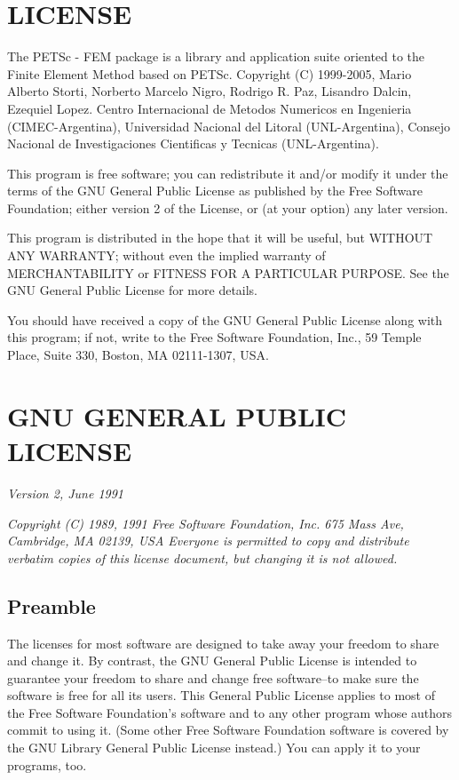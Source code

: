 \section{LICENSE}

The PETSc - FEM package is a library and application suite oriented to
the Finite Element Method based on PETSc.  Copyright (C) 1999-2005,
Mario Alberto Storti, Norberto Marcelo Nigro, Rodrigo R. Paz, Lisandro
Dalcin, Ezequiel Lopez. Centro Internacional de Metodos Numericos en
Ingenieria (CIMEC-Argentina), Universidad Nacional del Litoral
(UNL-Argentina), Consejo Nacional de Investigaciones Cientificas y
Tecnicas (UNL-Argentina).
  
This program is free software; you can redistribute it and/or
modify it under the terms of the GNU General Public License
as published by the Free Software Foundation; either version 2
of the License, or (at your option) any later version.

This program is distributed in the hope that it will be useful,
but WITHOUT ANY WARRANTY; without even the implied warranty of
MERCHANTABILITY or FITNESS FOR A PARTICULAR PURPOSE.  See the
GNU General Public License for more details.

You should have received a copy of the GNU General Public License along
with this program; if not, write to the Free Software Foundation, Inc.,
59 Temple Place, Suite 330, Boston, MA 02111-1307, USA.

\section{GNU GENERAL PUBLIC LICENSE}

\emph{Version 2, June 1991}

\emph{Copyright (C) 1989, 1991 Free Software Foundation, Inc.
675 Mass Ave, Cambridge, MA 02139, USA Everyone is permitted to copy
and distribute verbatim copies of this license document, but changing
it is not allowed.}

\subsection{Preamble}

The licenses for most software are designed to take away your freedom
to share and change it.  By contrast, the GNU General Public License
is intended to guarantee your freedom to share and change free
software--to make sure the software is free for all its users.  This
General Public License applies to most of the Free Software
Foundation's software and to any other program whose authors commit to
using it.  (Some other Free Software Foundation software is covered by
the GNU Library General Public License instead.)  You can apply it to
your programs, too.


